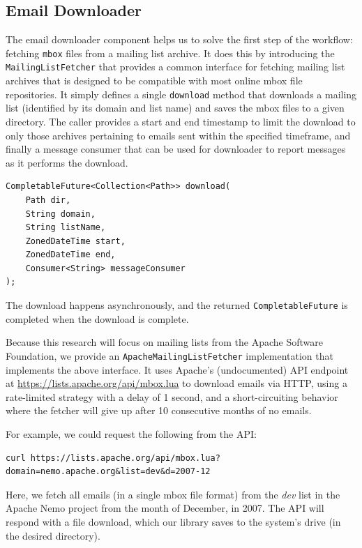 \documentclass[a4paper, 12pt]{article}
\begin{document}
	\subsection{Email Downloader}
		The email downloader component helps us to solve the first step of the workflow: fetching \texttt{mbox} files from a mailing list archive. It does this by introducing the \texttt{MailingListFetcher} that provides a common interface for fetching mailing list archives that is designed to be compatible with most online mbox file repositories. It simply defines a single \texttt{download} method that downloads a mailing list (identified by its domain and list name) and saves the mbox files to a given directory. The caller provides a start and end timestamp to limit the download to only those archives pertaining to emails sent within the specified timeframe, and finally a message consumer that can be used for downloader to report messages as it performs the download.
		
		\begin{verbatim}
CompletableFuture<Collection<Path>> download(
	Path dir,
	String domain,
	String listName,
	ZonedDateTime start,
	ZonedDateTime end,
	Consumer<String> messageConsumer
);
		\end{verbatim}
	
		The download happens asynchronously, and the returned \texttt{CompletableFuture} is completed when the download is complete.
		
		Because this research will focus on mailing lists from the Apache Software Foundation, we provide an \texttt{ApacheMailingListFetcher} implementation that implements the above interface. It uses Apache's (undocumented) API endpoint at \href{https://lists.apache.org/api/mbox.lua}{https://lists.apache.org/api/mbox.lua} to download emails via HTTP, using a rate-limited strategy with a delay of 1 second, and a short-circuiting behavior where the fetcher will give up after 10 consecutive months of no emails.
		
		For example, we could request the following from the API:
		
		\begin{verbatim}
curl https://lists.apache.org/api/mbox.lua?domain=nemo.apache.org&list=dev&d=2007-12
		\end{verbatim}
		
		Here, we fetch all emails (in a single mbox file format) from the \textit{dev} list in the Apache Nemo project from the month of December, in 2007. The API will respond with a file download, which our library saves to the system's drive (in the desired directory).
		
\end{document}
